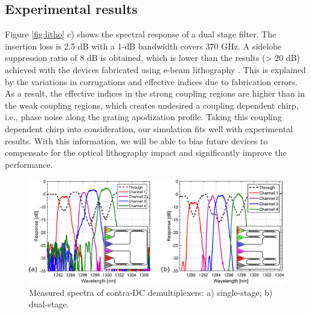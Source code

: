 \documentclass[letterpaper,10pt]{article}
\begin{document}
\subsection{Experimental results}
Figure \ref{fig:litho} c) shows the spectral response of a dual stage filter. The insertion loss is 2.5 dB with a 1-dB bandwidth covers 370 GHz. A sidelobe suppression ratio of 8 dB is obtained, which is lower than the results (> 20 dB) achieved with the devices fabricated using e-beam lithography \cite{shi2013siliconCWDM}. This is explained by the variations in corrugations and effective indices due to fabrication errors. 
As a result, the effective indices in the strong coupling regions are higher than in the weak coupling regions, which creates undesired a coupling dependent chirp, i.e., phase noise along the grating apodization profile. Taking this coupling dependent chirp into consideration, our simulation fits well with experimental results. With this information, we will be able to bias future devices to compensate for the optical lithography impact and significantly improve the performance.

\begin{figure}[htbp]
	\centering
	\includegraphics[width=.8\columnwidth]{WDM}
	\caption{Measured spectra of contra-DC demultiplexers: a) single-stage; b) dual-stage.}
    \vspace{-15pt}
	\label{fig:WDM}
\end{figure}
\end{document}
